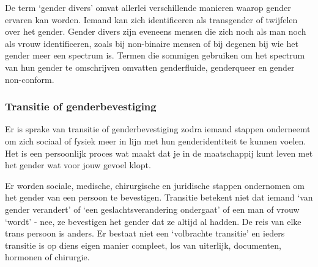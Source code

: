 \documentclass[12pt,openany]{book}
\begin{document}
\noindent{}

\smallskip

De term ‘gender divers’ omvat allerlei verschillende manieren waarop gender ervaren kan worden. Iemand kan zich identificeren als transgender of twijfelen over het gender. Gender divers zijn eveneens mensen die zich noch als man noch als vrouw identificeren, zoals bij non-binaire mensen of bij degenen bij wie het gender meer een spectrum is. Termen die sommigen gebruiken om het spectrum van hun gender te omschrijven omvatten genderfluide, genderqueer en gender non-conform. 

\subsubsection*{Transitie of genderbevestiging}

Er is sprake van transitie of genderbevestiging zodra iemand stappen onderneemt om zich sociaal of fysiek meer in lijn met hun genderidentiteit te kunnen voelen. Het is een persoonlijk proces wat maakt dat je in de maatschappij kunt leven met het gender wat voor jouw gevoel klopt.

Er worden sociale, medische, chirurgische en juridische stappen ondernomen om het gender van een persoon te bevestigen. Transitie betekent niet dat iemand ‘van gender verandert’ of ‘een geslachtsverandering ondergaat’ of een man of vrouw ‘wordt’ -  nee, ze bevestigen het gender dat ze altijd al hadden. De reis van elke trans persoon is anders. Er bestaat niet een ‘volbrachte transitie’ en ieders transitie is op diens eigen manier compleet, los van uiterlijk, documenten, hormonen of chirurgie.  
\end{document}
